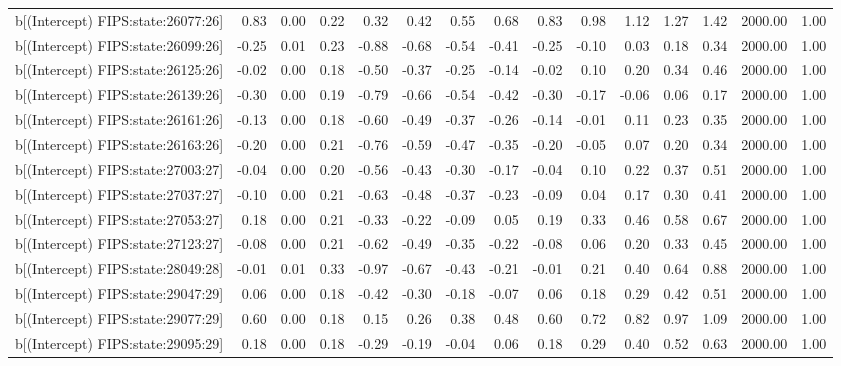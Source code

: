 \begin{table}[ht]
\begin{tabular}{rrrrrrrrrrrrrrr}
  b[(Intercept) FIPS:state:26077:26] & 0.83 & 0.00 & 0.22 & 0.32 & 0.42 & 0.55 & 0.68 & 0.83 & 0.98 & 1.12 & 1.27 & 1.42 & 2000.00 & 1.00 \\ 
  b[(Intercept) FIPS:state:26099:26] & -0.25 & 0.01 & 0.23 & -0.88 & -0.68 & -0.54 & -0.41 & -0.25 & -0.10 & 0.03 & 0.18 & 0.34 & 2000.00 & 1.00 \\ 
  b[(Intercept) FIPS:state:26125:26] & -0.02 & 0.00 & 0.18 & -0.50 & -0.37 & -0.25 & -0.14 & -0.02 & 0.10 & 0.20 & 0.34 & 0.46 & 2000.00 & 1.00 \\ 
  b[(Intercept) FIPS:state:26139:26] & -0.30 & 0.00 & 0.19 & -0.79 & -0.66 & -0.54 & -0.42 & -0.30 & -0.17 & -0.06 & 0.06 & 0.17 & 2000.00 & 1.00 \\ 
  b[(Intercept) FIPS:state:26161:26] & -0.13 & 0.00 & 0.18 & -0.60 & -0.49 & -0.37 & -0.26 & -0.14 & -0.01 & 0.11 & 0.23 & 0.35 & 2000.00 & 1.00 \\ 
  b[(Intercept) FIPS:state:26163:26] & -0.20 & 0.00 & 0.21 & -0.76 & -0.59 & -0.47 & -0.35 & -0.20 & -0.05 & 0.07 & 0.20 & 0.34 & 2000.00 & 1.00 \\ 
  b[(Intercept) FIPS:state:27003:27] & -0.04 & 0.00 & 0.20 & -0.56 & -0.43 & -0.30 & -0.17 & -0.04 & 0.10 & 0.22 & 0.37 & 0.51 & 2000.00 & 1.00 \\ 
  b[(Intercept) FIPS:state:27037:27] & -0.10 & 0.00 & 0.21 & -0.63 & -0.48 & -0.37 & -0.23 & -0.09 & 0.04 & 0.17 & 0.30 & 0.41 & 2000.00 & 1.00 \\ 
  b[(Intercept) FIPS:state:27053:27] & 0.18 & 0.00 & 0.21 & -0.33 & -0.22 & -0.09 & 0.05 & 0.19 & 0.33 & 0.46 & 0.58 & 0.67 & 2000.00 & 1.00 \\ 
  b[(Intercept) FIPS:state:27123:27] & -0.08 & 0.00 & 0.21 & -0.62 & -0.49 & -0.35 & -0.22 & -0.08 & 0.06 & 0.20 & 0.33 & 0.45 & 2000.00 & 1.00 \\ 
  b[(Intercept) FIPS:state:28049:28] & -0.01 & 0.01 & 0.33 & -0.97 & -0.67 & -0.43 & -0.21 & -0.01 & 0.21 & 0.40 & 0.64 & 0.88 & 2000.00 & 1.00 \\ 
  b[(Intercept) FIPS:state:29047:29] & 0.06 & 0.00 & 0.18 & -0.42 & -0.30 & -0.18 & -0.07 & 0.06 & 0.18 & 0.29 & 0.42 & 0.51 & 2000.00 & 1.00 \\ 
  b[(Intercept) FIPS:state:29077:29] & 0.60 & 0.00 & 0.18 & 0.15 & 0.26 & 0.38 & 0.48 & 0.60 & 0.72 & 0.82 & 0.97 & 1.09 & 2000.00 & 1.00 \\ 
  b[(Intercept) FIPS:state:29095:29] & 0.18 & 0.00 & 0.18 & -0.29 & -0.19 & -0.04 & 0.06 & 0.18 & 0.29 & 0.40 & 0.52 & 0.63 & 2000.00 & 1.00 \\ 

\end{tabular}
\end{table}
